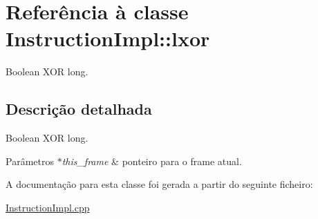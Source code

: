 \hypertarget{class_instruction_impl_1_1lxor}{}\section{Referência à classe Instruction\+Impl\+:\+:lxor}
\label{class_instruction_impl_1_1lxor}


Boolean X\+OR long.  




\subsection{Descrição detalhada}
Boolean X\+OR long. 


\begin{DoxyParams}{Parâmetros}
{\em $\ast$this\+\_\+frame} & ponteiro para o frame atual.  \\
\hline
\end{DoxyParams}


A documentação para esta classe foi gerada a partir do seguinte ficheiro\+:\begin{DoxyCompactItemize}
\item 
\hyperlink{_instruction_impl_8cpp}{Instruction\+Impl.\+cpp}\end{DoxyCompactItemize}
